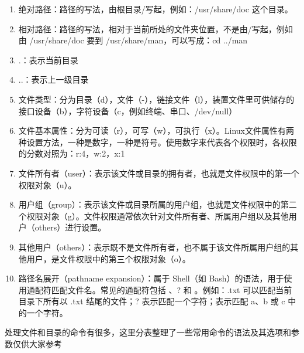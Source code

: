 \begin{enumerate}
\item 绝对路径：路径的写法，由根目录\enspace /\enspace 写起，例如：/usr/share/doc 这个目录。
\item 相对路径：路径的写法，相对于当前所处的文件夹位置，不是由\enspace /\enspace 写起，例如由 /usr/share/doc 要到 /usr/share/man，可以写成：cd ../man
\item \enspace .\enspace ：表示当前目录
\item \enspace ..\enspace ：表示上一级目录
\item 文件类型：分为目录（d），文件（-），链接文件（l），装置文件里可供储存的接口设备（b），字符设备（c，例如终端、串口、/dev/null）
\item 文件基本属性：分为可读（r），可写（w），可执行（x）。Linux文件属性有两种设置方法，一种是数字，一种是符号。使用数字来代表各个权限时，各权限的分数对照为：r:4，w:2，x:1
\item 文件所有者（user）：表示该文件或目录的拥有者，也就是文件权限中的第一个权限对象（u）。
\item 用户组（group）：表示该文件或目录所属的用户组，也就是文件权限中的第二个权限对象（g）。文件权限通常依次针对文件所有者、所属用户组以及其他用户（others）进行设置。
\item 其他用户（others）：表示既不是文件所有者，也不属于该文件所属用户组的其他用户，是文件权限中的第三个权限对象（o）。
\item 路径名展开（pathname expansion）：属于 Shell（如 Bash）的语法，用于使用通配符匹配文件名。常见的通配符包括 \enspace * \enspace、\enspace ? \enspace 和 \enspace [ ] \enspace。例如：\enspace *.txt \enspace 可以匹配当前目录下所有以 .txt 结尾的文件；\enspace ? \enspace 表示匹配一个字符；\enspace [abc] \enspace 表示匹配 a、b 或 c 中的一个字符。
\end{enumerate}

处理文件和目录的命令有很多，这里分表整理了一些常用命令的语法及其选项和参数仅供大家参考



